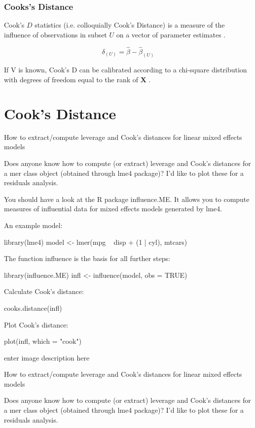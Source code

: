 \documentclass[12pt, a4paper]{article}
\begin{document}
\subsection{Cooks's Distance}%
 Cook's $D$ statistics (i.e. colloquially Cook's Distance) is a measure of the influence of observations in subset $U$ on a vector of parameter estimates \citep{cook77}.

\[ \delta_{(U)} = \hat{\beta} - \hat{\beta}_{(U)}\]

If V is known, Cook's D can be calibrated according to a chi-square distribution with degrees of freedom equal to the rank of $\boldsymbol{X}$ \citep{cpj92}.	
	

\chapter{Cook's Distance}
How to extract/compute leverage and Cook's distances for linear mixed effects models

Does anyone know how to compute (or extract) leverage and Cook's distances for a mer class object (obtained through lme4 package)? I'd like to plot these for a residuals analysis.

You should have a look at the R package influence.ME. It allows you to compute measures of influential data for mixed effects models generated by lme4.

An example model:

library(lme4)
model <- lmer(mpg ~ disp + (1 | cyl), mtcars)

The function influence is the basis for all further steps:

library(influence.ME)
infl <- influence(model, obs = TRUE)

Calculate Cook's distance:

cooks.distance(infl)

Plot Cook's distance:

plot(infl, which = "cook")

enter image description here



How to extract/compute leverage and Cook's distances for linear mixed effects models

Does anyone know how to compute (or extract) leverage and Cook's distances for a mer class object (obtained through lme4 package)? I'd like to plot these for a residuals analysis.
\end{document}
